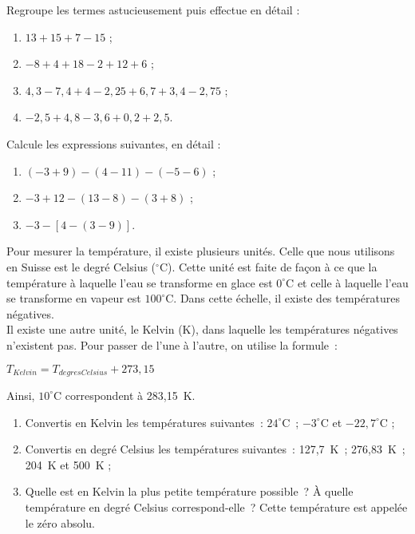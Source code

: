 \begin{exercice}
Regroupe les termes astucieusement puis effectue en détail :
\begin{enumerate}
 \item $13 + 15 + 7 - 15$ ;
 \item $- 8 + 4 + 18 - 2 + 12 + 6$ ;
 \item $4,3 - 7,4 + 4 - 2,25 + 6,7 + 3,4 - 2,75$ ;
 \item $- 2,5 + 4,8 - 3,6 + 0,2 + 2,5$.
 \end{enumerate}
\end{exercice}


\begin{exercice}
Calcule les expressions suivantes, en détail :
\begin{enumerate}
 \item $(- 3 + 9) - (4 - 11) - (- 5 - 6)$ ;
 \item $- 3 + 12 - (13 - 8) - (3 + 8)$ ;
 \item $- 3 - [4 - (3 - 9)]$.
 \end{enumerate}
\end{exercice}


\begin{exercice}[Températures]
Pour mesurer la température, il existe plusieurs unités. Celle que nous utilisons en Suisse est le degré Celsius ($^{\circ}$C). Cette unité est faite de façon à ce que la température à laquelle l'eau se transforme en glace est $0^{\circ}$C et celle à laquelle l'eau se transforme en vapeur est $100^{\circ}$C. Dans cette échelle, il existe des températures négatives. \\[0.5em]
Il existe une autre unité, le Kelvin (K), dans laquelle les températures négatives n'existent pas. Pour passer de l'une à l'autre, on utilise la formule :
\begin{center} $T_{Kelvin} = T_{degresCelsius} + 273,15$ \end{center}
Ainsi, $10^{\circ}$C correspondent à 283,15 K.
\begin{enumerate}
 \item Convertis en Kelvin les températures suivantes : $24^{\circ}$C ; $- 3^{\circ}$C et $- 22,7^{\circ}$C ;
 \item Convertis en degré Celsius les températures suivantes : 127,7 K ; 276,83 K ; 204 K et 500 K ;
 \item Quelle est en Kelvin la plus petite température possible ? À quelle température en degré Celsius correspond-elle ? Cette température est appelée le zéro absolu.
 \end{enumerate}
\end{exercice}